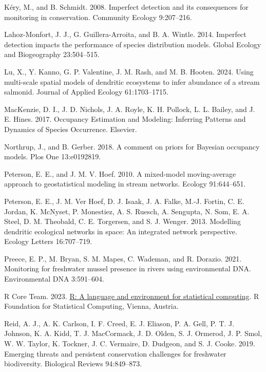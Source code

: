 \documentclass[
  11pt,
  a4paper,
]{article}
\newlength{\cslhangindent}
\newenvironment{CSLReferences}[2] %
 {\begin{list}{}{%
  \setlength{\itemindent}{0pt}
  \setlength{\leftmargin}{0pt}
  \setlength{\parsep}{0pt}
  \ifodd #1
   \setlength{\leftmargin}{\cslhangindent}
   \setlength{\itemindent}{-1\cslhangindent}
  \fi
  \setlength{\itemsep}{#2\baselineskip}}}
 {\end{list}}
\begin{document}
\begin{CSLReferences}{1}{0}
Kéry, M., and B. Schmidt. 2008. Imperfect detection and its consequences for monitoring in conservation. Community Ecology 9:207--216.

Lahoz-Monfort, J. J., G. Guillera-Arroita, and B. A. Wintle. 2014. Imperfect detection impacts the performance of species distribution models. Global Ecology and Biogeography 23:504--515.

Lu, X., Y. Kanno, G. P. Valentine, J. M. Rash, and M. B. Hooten. 2024. Using multi-scale spatial models of dendritic ecosystems to infer abundance of a stream salmonid. Journal of Applied Ecology 61:1703--1715.

MacKenzie, D. I., J. D. Nichols, J. A. Royle, K. H. Pollock, L. L. Bailey, and J. E. Hines. 2017. Occupancy {Estimation} and {Modeling}: {Inferring Patterns} and {Dynamics} of {Species Occurrence}. {Elsevier}.

Northrup, J., and B. Gerber. 2018. A comment on priors for {B}ayesian occupancy models. Plos One 13:e0192819.

Peterson, E. E., and J. M. V. Hoef. 2010. A mixed-model moving-average approach to geostatistical modeling in stream networks. Ecology 91:644--651.

Peterson, E. E., J. M. Ver Hoef, D. J. Isaak, J. A. Falke, M.-J. Fortin, C. E. Jordan, K. McNyset, P. Monestiez, A. S. Ruesch, A. Sengupta, N. Som, E. A. Steel, D. M. Theobald, C. E. Torgersen, and S. J. Wenger. 2013. Modelling dendritic ecological networks in space: An integrated network perspective. Ecology Letters 16:707--719.

Preece, E. P., M. Bryan, S. M. Mapes, C. Wademan, and R. Dorazio. 2021. Monitoring for freshwater mussel presence in rivers using environmental DNA. Environmental DNA 3:591--604.

R Core Team. 2023. \href{https://www.R-project.org/}{R: A language and environment for statistical computing}. R Foundation for Statistical Computing, Vienna, Austria.

Reid, A. J., A. K. Carlson, I. F. Creed, E. J. Eliason, P. A. Gell, P. T. J. Johnson, K. A. Kidd, T. J. MacCormack, J. D. Olden, S. J. Ormerod, J. P. Smol, W. W. Taylor, K. Tockner, J. C. Vermaire, D. Dudgeon, and S. J. Cooke. 2019. Emerging threats and persistent conservation challenges for freshwater biodiversity. Biological Reviews 94:849--873.


\end{CSLReferences}
\end{document}
